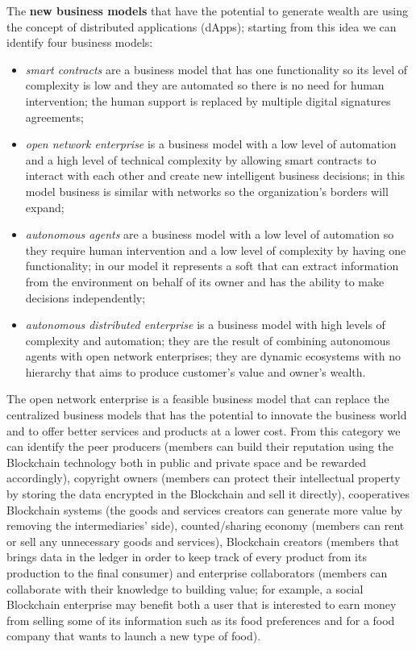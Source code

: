 The \textbf{new business models} that have the potential to generate wealth are using the concept of distributed applications (dApps); starting from this idea we can identify four business models: 
\begin{itemize}
	\item \emph{smart contracts} are a business model that has one functionality so its level of complexity is low and they are automated so there is no need for human intervention; the human support is replaced by multiple digital signatures agreements;
	\item \emph{open network enterprise} is a business model with a low level of automation and a high level of technical complexity by allowing smart contracts to interact with each other and create new intelligent business decisions; in this model business is similar with networks so the organization's borders will expand;
	\item \emph{autonomous agents} are a business model with a low level of automation so they require human intervention and a low level of complexity by having one functionality; in our model it represents a soft that can extract information from the environment on behalf of its owner and has the ability to make decisions independently;
	\item \emph{autonomous distributed enterprise} is a business model with high levels of complexity and automation; they are the result of combining autonomous agents with open network enterprises; they are dynamic ecosystems with no hierarchy that aims to produce customer's value and owner's wealth.
\end{itemize}
The open network enterprise is a feasible business model that can replace the centralized business models that has the potential to innovate the business world and to offer better services and products at a lower cost. From this category we can identify the peer producers (members can build their reputation using the Blockchain technology both in public and private space and be rewarded accordingly), copyright owners (members can protect their intellectual property by storing the data encrypted in the Blockchain and sell it directly), cooperatives Blockchain systems (the goods and services creators can generate more value by removing the intermediaries' side), counted/sharing economy (members can rent or sell any unnecessary goods and services), Blockchain creators (members that brings data in the ledger in order to keep track of every product from its production to the final consumer) and enterprise collaborators (members can collaborate with their knowledge to building value; for example, a social Blockchain enterprise may benefit both a user that is interested to earn money from selling some of its information such as its food preferences and for a food company that wants to launch a new  type of food).

